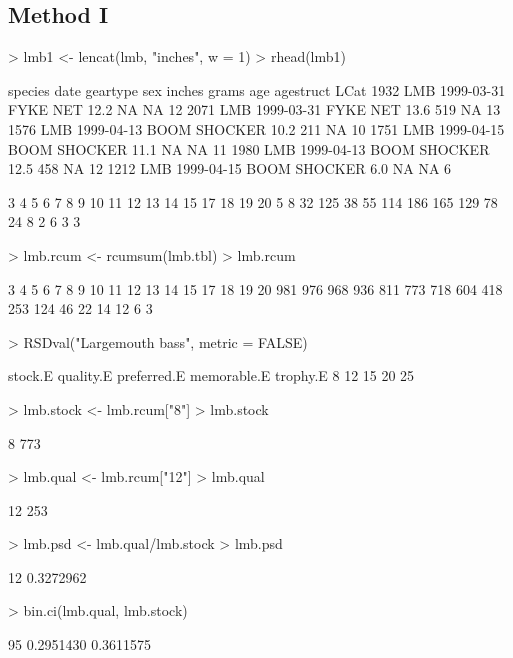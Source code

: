 \documentclass[a4paper]{article}
\begin{document}
\subsection{Method I}
\begin{Schunk}
\begin{Sinput}
> lmb1 <- lencat(lmb, "inches", w = 1)
> rhead(lmb1)
\end{Sinput}
\begin{Soutput}
     species       date     geartype sex inches grams age agestruct LCat
1932     LMB 1999-03-31     FYKE NET       12.2    NA  NA             12
2071     LMB 1999-03-31     FYKE NET       13.6   519  NA             13
1576     LMB 1999-04-13 BOOM SHOCKER       10.2   211  NA             10
1751     LMB 1999-04-15 BOOM SHOCKER       11.1    NA  NA             11
1980     LMB 1999-04-13 BOOM SHOCKER       12.5   458  NA             12
1212     LMB 1999-04-15 BOOM SHOCKER        6.0    NA  NA              6
\end{Soutput}
\begin{Soutput}
  3   4   5   6   7   8   9  10  11  12  13  14  15  17  18  19  20
  5   8  32 125  38  55 114 186 165 129  78  24   8   2   6   3   3
\end{Soutput}
\begin{Sinput}
> lmb.rcum <- rcumsum(lmb.tbl)
> lmb.rcum
\end{Sinput}
\begin{Soutput}
  3   4   5   6   7   8   9  10  11  12  13  14  15  17  18  19  20
981 976 968 936 811 773 718 604 418 253 124  46  22  14  12   6   3
\end{Soutput}
\begin{Sinput}
> RSDval("Largemouth bass", metric = FALSE)
\end{Sinput}
\begin{Soutput}
    stock.E   quality.E preferred.E memorable.E    trophy.E
          8          12          15          20          25
\end{Soutput}
\begin{Sinput}
> lmb.stock <- lmb.rcum["8"]
> lmb.stock
\end{Sinput}
\begin{Soutput}
  8
773
\end{Soutput}
\begin{Sinput}
> lmb.qual <- lmb.rcum["12"]
> lmb.qual
\end{Sinput}
\begin{Soutput}
 12
253
\end{Soutput}
\begin{Sinput}
> lmb.psd <- lmb.qual/lmb.stock
> lmb.psd
\end{Sinput}
\begin{Soutput}
       12
0.3272962
\end{Soutput}
\begin{Sinput}
> bin.ci(lmb.qual, lmb.stock)
\end{Sinput}
\begin{Soutput}
  95% LCI   95% UCI
0.2951430 0.3611575
\end{Soutput}
\end{Schunk}
\end{document}
